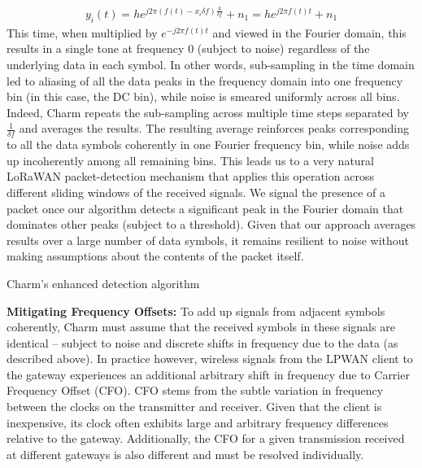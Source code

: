 \begin{align}
    y_i\left(t\right) = h e^{j 2 \pi (f(t) - x_i \delta f) \frac{k}{\delta f}} + n_1 = h e^{j 2 \pi f(t) t} + n_1\label{eqn:yi2}
\end{align}
This time, when multiplied by $e^{-j 2 \pi f(t) t}$ and viewed in the Fourier
domain, this results in a single tone at frequency $0$ (subject to noise)
regardless of the underlying data in each symbol. In other words, sub-sampling
in the time domain led to aliasing of all the data peaks in the frequency
domain into one frequency bin (in this case, the DC bin), while noise is
smeared uniformly across all bins. Indeed, Charm repeats the sub-sampling
across multiple time steps separated  by $\frac{1}{\delta f}$ and averages the
results. The resulting average reinforces peaks corresponding to all the data
symbols coherently in one Fourier frequency bin, while noise adds up
incoherently among all remaining bins. This leads us to a very natural LoRaWAN
packet-detection mechanism that applies this operation across different
sliding windows of the received signals. We signal the presence of a packet
once our algorithm detects a significant peak in the Fourier domain that
dominates other peaks (subject to a threshold). Given that our approach
averages results over a large number of data symbols, it remains resilient to
noise without making assumptions about the contents of the packet itself.

\LinesNumbered
\begin{algorithm}[ht]
\caption{Charm's enhanced detection algorithm}
\label{alg:algorithm-label2}
\end{algorithm}

\noindent \textbf{Mitigating Frequency Offsets: } To add up signals from
adjacent symbols coherently, Charm must assume that the received symbols in
these signals are identical -- subject to noise and discrete shifts in
frequency due to the data (as described above). In practice however, wireless
signals from the LPWAN client to the gateway experiences an additional
arbitrary shift in frequency due to Carrier Frequency Offset (CFO). CFO stems
from the subtle variation in frequency between the clocks on the transmitter
and receiver. Given that the client is inexpensive, its clock often exhibits
large and arbitrary frequency differences relative to the gateway.
Additionally, the CFO for a given transmission received at different gateways
is also different and must be resolved individually.

